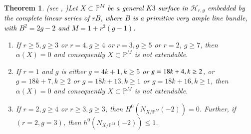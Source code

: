 \documentclass[11pt,twoside]{amsart}
\theoremstyle{plain}
\numberwithin{equation}{section}
\newtheorem{theorem}{Theorem}[section]
\newtheorem{corollary}[theorem]{Corollary}
\theoremstyle{definition}
\begin{document}
\begin{theorem}(see , )\label{non-extendability of K3 surfaces intro}
    Let \textcolor{black}{$X \subset \mathbb{P}^{M}$ be a general $K3$ surface in $\mathcal{H}_{r,g}$ embedded by the complete linear series of $rB$, where $B$ is a primitive very ample line bundle, with $B^2 = 2g-2$ and $M = 1+r^2(g-1)$.}
    
    \begin{enumerate}
        \item If $r \geq 5, g \geq 3$ or $r = 4, g \geq 4$ or $r = 3, g \geq 5$ or $r = 2$, $g \geq 7$, then $\alpha(X) = 0$ and consequently $X \subset \mathbb{P}^M$ is not extendable. 

       
        \item If $r = 1$ and $g$ is either $g = 4k+1, k \geq 5$ or $g = 18k+4, \textcolor{black}{k \geq 2}$, or $g = 18k+7, k \geq 2$ or $g = 18k+13, k \geq 1$ or $g = 18k+16, k \geq 1$, then $\alpha(X) = 0$ and consequently $X \subset \mathbb{P}^M$ is not extendable.
        
        \item[(3)] If $r = 2, g \geq 4$ or $r \geq 3, g \geq 3$, then $H^0(N_{X/\mathbb{P}^M}(-2)) = 0$. Further, if $(r = 2, g = 3)$, then $h^0(N_{X/\mathbb{P}^M}(-2)) \leq 1$.
        
        
    \end{enumerate}
\end{theorem}

 \par

\vspace{0.2cm}

\color{black}


\end{document}
